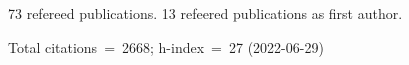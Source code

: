 73 refereed publications. 13 refeered publications as first author.

Total citations~=~2668; h-index~=~27 (2022-06-29)
